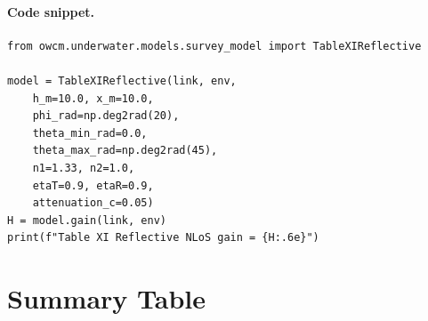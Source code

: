\documentclass[11pt,a4paper]{article}
\begin{document}
\paragraph{Code snippet.}
\begin{lstlisting}
from owcm.underwater.models.survey_model import TableXIReflective

model = TableXIReflective(link, env,
    h_m=10.0, x_m=10.0,
    phi_rad=np.deg2rad(20),
    theta_min_rad=0.0,
    theta_max_rad=np.deg2rad(45),
    n1=1.33, n2=1.0,
    etaT=0.9, etaR=0.9,
    attenuation_c=0.05)
H = model.gain(link, env)
print(f"Table XI Reflective NLoS gain = {H:.6e}")
\end{lstlisting}


\newpage
\section{Summary Table}
\end{document}

